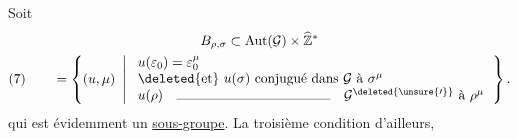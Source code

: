 Soit
\[
\begin{gathered}
B_{\rho,\sigma}\subset\operatorname{Aut}(\mathcal{G})\times\widehat{\mathbb Z}^{*}
\\
(7)\qquad =\left\{(u,\mu)\ \left|\
\begin{array}{l}
u(\varepsilon_0)=\varepsilon_0^\mu\\
\deleted{\text{et}}\ u(\sigma)\ \text{conjugué dans }\mathcal{G}\text{ à }\sigma^\mu\\
u(\rho)\quad\rule{4cm}{0.3pt}\quad
\mathcal{G}^{\deleted{\unsure{\prime}}}\text{ à }\rho^\mu
\end{array}\right.\right\}.
\end{gathered}
\]
qui est évidemment un \uline{sous-groupe}.
La troisième condition  d'ailleurs,


